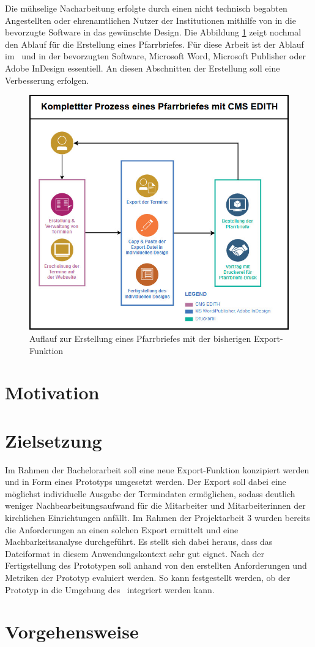 \abschnitt
Die mühselige Nacharbeitung erfolgte durch einen nicht technisch begabten Angestellten oder ehrenamtlichen Nutzer der Institutionen mithilfe von  in die bevorzugte Software in das gewünschte Design. Die Abbildung \ref{img:AblaufErstellungPfarrbrief} zeigt nochmal den Ablauf für die Erstellung eines Pfarrbriefes. Für diese Arbeit ist der Ablauf im \cmsEdith \, und in der bevorzugten Software, Microsoft Word, Microsoft Publisher oder Adobe InDesign essentiell. An diesen Abschnitten der Erstellung soll eine Verbesserung erfolgen.\newline
\begin{figure}[h]
	\centering
	\includegraphics[width=12cm]{bilder/kompletterJetzigerProzess.png}
    \caption{Auflauf zur Erstellung eines Pfarrbriefes mit der bisherigen Export-Funktion}
    \label{img:AblaufErstellungPfarrbrief}
\end{figure} \abschnitt

\section{Motivation} \label{motivation}



\section{Zielsetzung} \label{zielsetzung}
Im Rahmen der Bachelorarbeit soll eine neue Export-Funktion konzipiert werden und in Form eines Prototyps umgesetzt werden. Der Export soll dabei eine möglichst individuelle Ausgabe der Termindaten ermöglichen, sodass deutlich weniger Nachbearbeitungsaufwand für die Mitarbeiter und Mitarbeiterinnen der kirchlichen Einrichtungen anfällt. Im Rahmen der Projektarbeit 3 wurden bereits die Anforderungen an einen solchen Export ermittelt und eine Machbarkeitsanalyse durchgeführt. Es stellt sich dabei heraus, dass das Dateiformat  in diesem Anwendungskontext sehr gut eignet. \abschnitt
Nach der Fertigstellung des Prototypen soll anhand von den erstellten Anforderungen und Metriken der Prototyp evaluiert werden. So kann festgestellt werden, ob der Prototyp in die Umgebung des \cmsEdith \, integriert werden kann.


\section{Vorgehensweise} \label{vorgehensweise}

